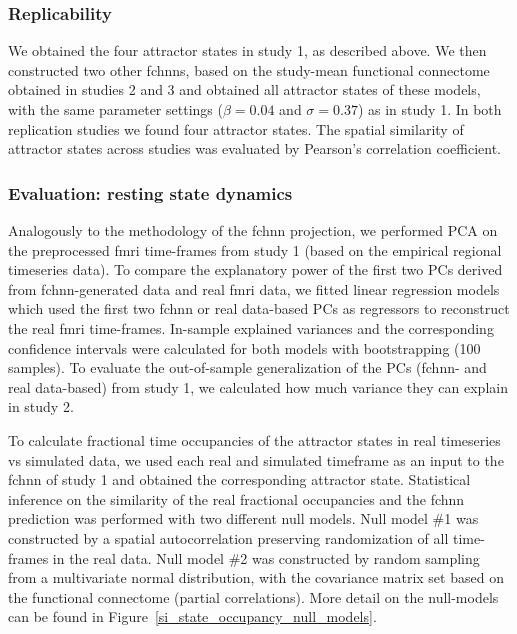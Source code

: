 \documentclass{article}
\begin{document}
\subsubsection{Replicability}

We obtained the four attractor states in study 1, as described above. We then constructed two other \acrshort{fchnn}s, based on the study-mean functional connectome obtained in studies 2 and 3 and  obtained all attractor states of these models, with the same parameter settings ($\beta = 0.04$ and $\sigma = 0.37$) as in study 1. In both replication studies we found four attractor states. The spatial similarity of attractor states across studies was evaluated by Pearson's correlation coefficient.

\subsubsection{Evaluation: resting state dynamics}

Analogously to the methodology of the \acrshort{fchnn} projection, we performed PCA on the preprocessed \acrshort{fmri} time-frames from study 1 (based on the empirical regional timeseries data).
To compare the explanatory power of the first two PCs derived from \acrshort{fchnn}-generated data and real \acrshort{fmri} data, we fitted linear regression models which used the first two \acrshort{fchnn} or real data-based PCs as regressors to reconstruct the real \acrshort{fmri} time-frames. In-sample explained variances and the corresponding confidence intervals were calculated for both models with bootstrapping (100 samples). To evaluate the out-of-sample generalization of the PCs (\acrshort{fchnn}- and real data-based) from study 1, we calculated how much variance they can explain in study 2.

To calculate fractional time occupancies of the attractor states in real timeseries vs simulated data, we used each real and simulated timeframe as an input to the \acrshort{fchnn} of study 1 and obtained the corresponding attractor state. Statistical inference on the similarity of the real fractional occupancies and the \acrshort{fchnn} prediction was performed with two different null models. Null model \#1 was constructed by a spatial autocorrelation preserving randomization of all time-frames in the real data. Null model \#2 was constructed  by random sampling from a multivariate normal distribution, with the covariance matrix set based on the functional connectome (partial correlations). More detail on the null-models can be found in Figure~\ref{si_state_occupancy_null_models}.
\end{document}
